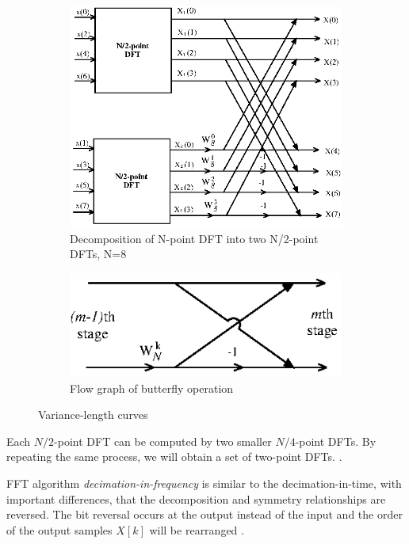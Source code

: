 \documentclass[twoside]{ctuthesis}
\theoremstyle{plain}
\theoremstyle{definition}
\theoremstyle{note}
\begin{document}
\begin{figure}
	\centering
	\begin{subfigure}{0.5\textwidth}
		\centering
		\includegraphics[width=1.0\linewidth]{fftDecomposition.eps}
		\caption{Decomposition of N-point DFT into two N/2-point DFTs, N=8 \cite{cite:RT_DSP}}
		\label{fig:fftDecomposition}
	\end{subfigure}%
	\begin{subfigure}{0.5\textwidth}
		\centering
		\includegraphics[width=1.0\textwidth]{butterfly.eps}
		\caption{Flow graph of butterfly operation \cite{cite:RT_DSP}}
		\label{fig:butterfly}
	\end{subfigure}
	\caption{Variance-length curves}
	\label{fig:fftExplanation}
\end{figure}
Each $N/2$-point DFT can be computed by two smaller $N/4$-point DFTs. By repeating the same process, we will obtain a set of two-point DFTs. \cite{cite:RT_DSP}.

FFT algorithm \textit{decimation-in-frequency} is similar to the decimation-in-time, with important differences, that the decomposition and symmetry relationships are reversed. The bit reversal occurs at the output instead of the input and the order of the output samples $X[k]$ will be rearranged \cite{cite:RT_DSP}.
\end{document}
